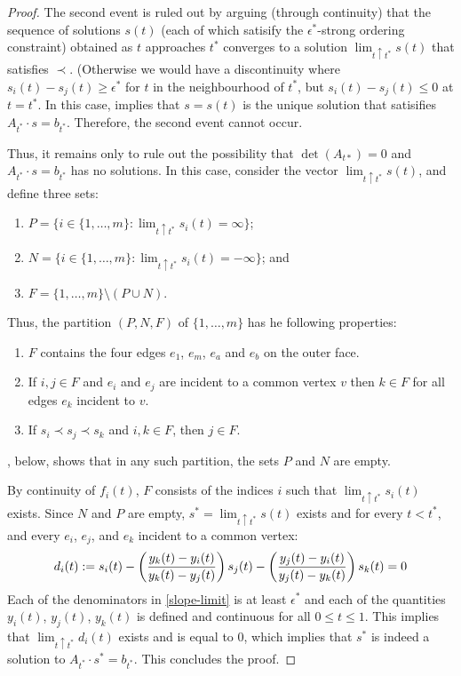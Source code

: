 \documentclass{patmorin}
\begin{document}
\begin{proof}
   The second event is ruled out by arguing (through continuity)
   that the sequence of solutions $s(t)$ (each of which satisify the
   $\epsilon^*$-strong ordering constraint) obtained as $t$ approaches
   $t^*$ converges to a solution $\lim_{t\uparrow t^*} s(t)$ that
   satisfies $\prec$.  (Otherwise we would have a discontinuity where
   $s_i(t)-s_j(t)\ge \epsilon^*$ for $t$ in the neighbourhood of $t^*$,
   but $s_i(t)-s_j(t) \le 0$ at $t=t^*$.   In this case, 
   implies that $s=s(t)$ is the unique solution that satisifies
   $A_{t^*}\cdot s=b_{t^*}$.  Therefore, the second event cannot occur.

   Thus, it remains only to rule out the possibility that $\det(A_{t*})=0$
   and $A_{t^*}\cdot s=b_{t^*}$ has no solutions.  In this case, consider the
   vector $\lim_{t\uparrow t^*} s(t)$, and define three sets:
   \begin{enumerate}
     \item $P=\{i\in \{1,\ldots,m\}:\lim_{t\uparrow t^*} s_i(t)=\infty\}$;
     \item $N=\{i\in \{1,\ldots,m\}:\lim_{t\uparrow t^*} s_i(t)=-\infty\}$; and
     \item $F=\{1,\ldots,m\}\setminus (P\cup N)$.
   \end{enumerate}

   Thus, the partition $(P,N,F)$ of $\{1,\ldots,m\}$ has he following
   properties:
   \begin{enumerate}
    \item $F$ contains the four edges $e_1$, $e_m$, $e_a$ and $e_b$
      on the outer face.
    \item If $i,j\in F$ and $e_i$ and $e_j$ are incident to a common
      vertex $v$ then $k\in F$ for all edges $e_k$ incident to $v$.
    \item If $s_i \prec s_j \prec s_k$ and $i,k\in F$, 
      then $j\in F$.
   \end{enumerate}
   , below, shows that in any such partition, the sets
   $P$ and $N$ are empty.

   By continuity of $f_i(t)$, $F$ consists of the indices $i$ such that
   $\lim_{t\uparrow t^*} s_i(t)$ exists.  Since $N$ and $P$ are empty,
   $s^*=\lim_{t\uparrow t^*} s(t)$ exists and for every $t<t^*$, and
   every $e_i$, $e_j$, and $e_k$ incident to a common vertex:
   \begin{equation}
       d_i(t) := s_i(t) - \left(\frac{y_k(t)-y_i(t)}{y_k(t)-y_j(t)}\right) s_j(t) - \left(\frac{y_j(t)-y_i(t)}{y_j(t)-y_k(t)}\right)s_k(t) = 0 \eqlabel{slope-limit}
   \end{equation}
   Each of the denominators in \eqref{slope-limit} is at least
   $\epsilon^*$ and each of the quantities $y_i(t)$, $y_j(t)$, $y_k(t)$
   is defined and continuous for all $0\le t\le 1$.  This implies
   that $\lim_{t\uparrow t^*} d_i(t)$ exists and is equal to 0, which
   implies that $s^*$ is indeed a solution to $A_{t^*}\cdot s^*=b_{t^*}$.
   This concludes the proof.
\end{proof}
\end{document}
